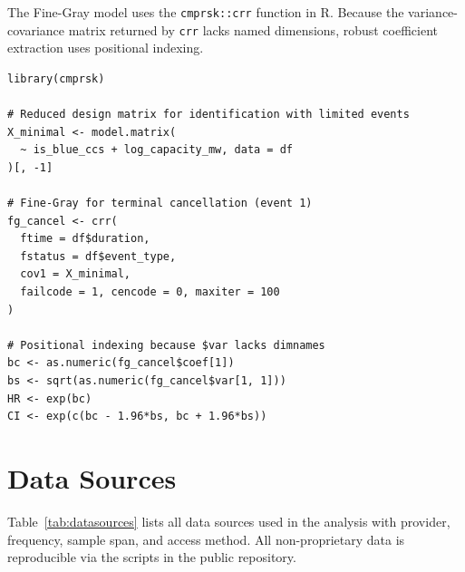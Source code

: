 \documentclass[11pt,a4paper]{article}
\begin{document}
The Fine-Gray model uses the \texttt{cmprsk::crr} function in R. Because the variance-covariance matrix returned by \texttt{crr} lacks named dimensions, robust coefficient extraction uses positional indexing.

\begin{lstlisting}[caption={Fine-Gray competing-risks fit in R.}, label={lst:fg}, basicstyle=\ttfamily\footnotesize, frame=single, backgroundcolor=\color{codebg}, breaklines=true]
library(cmprsk)

# Reduced design matrix for identification with limited events
X_minimal <- model.matrix(
  ~ is_blue_ccs + log_capacity_mw, data = df
)[, -1]

# Fine-Gray for terminal cancellation (event 1)
fg_cancel <- crr(
  ftime = df$duration,
  fstatus = df$event_type,
  cov1 = X_minimal,
  failcode = 1, cencode = 0, maxiter = 100
)

# Positional indexing because $var lacks dimnames
bc <- as.numeric(fg_cancel$coef[1])
bs <- sqrt(as.numeric(fg_cancel$var[1, 1]))
HR <- exp(bc)
CI <- exp(c(bc - 1.96*bs, bc + 1.96*bs))
\end{lstlisting}

\section{Data Sources}

Table~\ref{tab:datasources} lists all data sources used in the analysis with provider, frequency, sample span, and access method. All non-proprietary data is reproducible via the scripts in the public repository.
\end{document}
